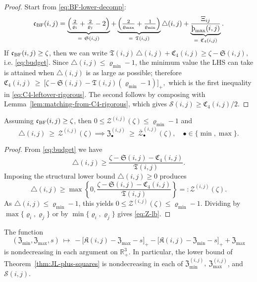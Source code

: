\documentclass[twoside,11pt]{article}
\numberwithin{equation}{section}
\numberwithin{theorem}{section}
\numberwithin{example}{section}
\newcommand{\sho}{\textup{\text{\th}}}
\begin{document}
\begin{proof}
Start from \eqref{eq:BF-lower-decomp}:
\[
\mathfrak c_{\rm BF}(i,j)
=\underbrace{\Big(\tfrac{2}{\varrho_i}+\tfrac{2}{\varrho_j}-2\Big)}_{=\ \mathfrak S(i,j)}
+\underbrace{\Big(\tfrac{2}{\varrho_{\max}}+\tfrac{1}{\varrho_{\min}}\Big)}_{=\ \mathfrak T(i,j)}\triangle(i,j)
+\underbrace{\frac{\Xi_{ij}}{\sho_{\max}(i,j)}}_{=\ \mathfrak C_4(i,j)}.
\]
If $\mathfrak c_{\rm BF}(i,j)\ge \zeta$, then we can write
\(
\mathfrak T(i,j)\,\triangle(i,j)+\mathfrak C_4(i,j)\ge \zeta-\mathfrak S(i,j),
\)
i.e. \eqref{eq:budget}. Since $\triangle(i,j)\le \varrho_{\min}-1$, the minimum value the LHS can take is attained when $\triangle(i,j)$ is as large as possible; therefore
\(
\mathfrak C_4(i,j)\ \ge\ \bigl[\zeta-\mathfrak S(i,j)-\mathfrak T(i,j)(\varrho_{\min}-1)\bigr]_+,
\)
which is the first inequality in \eqref{eq:C4-leftover-rigorous}. The second follows by composing with Lemma~\ref{lem:matching-from-C4-rigorous}, which gives $\mathscr S(i,j)\ge \mathfrak C_4(i,j)/2$.
\end{proof}

\begin{lemma}
\label{lem:Z-range}
Assuming $\mathfrak c_{\rm BF}(i,j)\ge \zeta$, then $0\le \mathscr Z^{(i,j)}(\zeta)\le \varrho_{\min}-1$ and
\begin{equation}
\label{eq:Z-lb}
\triangle(i,j)\ \ge\ \mathscr Z^{(i,j)}(\zeta)
\implies
\mathfrak Z^{(i,j)}_{\bullet}\ \ge\ \overline{\mathscr Z}^{(i,j)}_{\bullet}(\zeta),\quad \bullet\in\{\min,\max\}.
\end{equation}
\end{lemma}

\begin{proof}
From \eqref{eq:budget} we have 
\[
\triangle(i,j)\ge \frac{\zeta-\mathfrak S(i,j)-\mathfrak C_4(i,j)}{\mathfrak T(i,j)}.
\]
Imposing the structural lower bound $\triangle(i,j)\ge 0$ produces
\[
\triangle(i,j)\ge \max\left\{0,\frac{\zeta-\mathfrak S(i,j)-\mathfrak C_4(i,j)}{\mathfrak T(i,j)}\right\}=: \mathscr Z^{(i,j)}(\zeta).
\]
As $\triangle(i,j)\le \varrho_{\min}-1$, this yields $0\le \mathscr Z^{(i,j)}(\zeta)\le \varrho_{\min}-1$. Dividing by $\max\{\varrho_i,\varrho_j\}$ or by $\min\{\varrho_i,\varrho_j\}$ gives \eqref{eq:Z-lb}.
\end{proof}

\begin{lemma}
\label{lem:JL-monotone-rigorous}
The function
\[
(\mathfrak Z_{\min},\mathfrak Z_{\max},s)\ \longmapsto\ 
-\bigl[\mathfrak K(i,j)-\mathfrak Z_{\max}-s\bigr]_+ - \bigl[\mathfrak K(i,j)-\mathfrak Z_{\min}-s\bigr]_+ + \mathfrak Z_{\max}
\]
is nondecreasing in each argument on $\mathbb R_{+}^3$. In particular, the lower bound of Theorem~\ref{thm:JL-plus-squares} is nondecreasing in each of
$\mathfrak Z_{\min}^{(i,j)},\ \mathfrak Z_{\max}^{(i,j)}$, and $\mathscr S(i,j)$.
\end{lemma}
\end{document}

